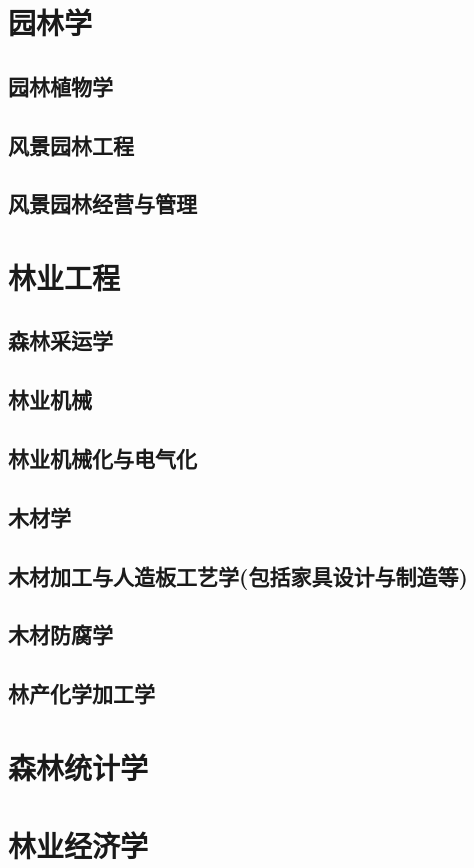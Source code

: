 \documentclass[UTF8]{../ApplicationUniverse}
\begin{document}
\chapter{园林学}
\section{园林植物学}
\section{风景园林工程}
\section{风景园林经营与管理}

\chapter{林业工程}
\section{森林采运学}
\section{林业机械}
\section{林业机械化与电气化}
\section{木材学}
\section{木材加工与人造板工艺学(包括家具设计与制造等)}
\section{木材防腐学}
\section{林产化学加工学}


\chapter{森林统计学}
\chapter{林业经济学}
\end{document}
